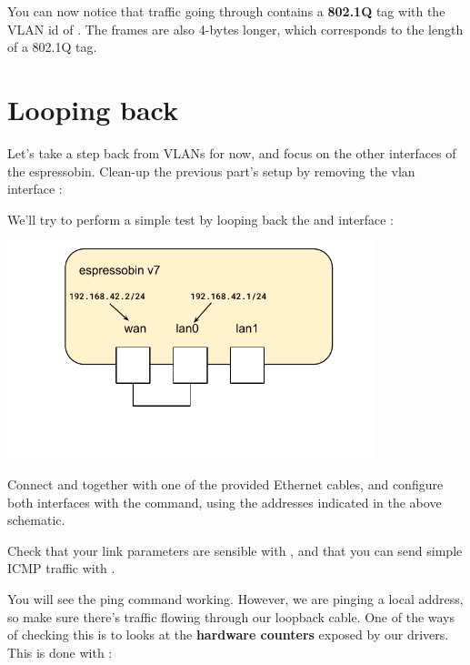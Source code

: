You can now notice that traffic going through  contains a \textbf{802.1Q} tag with the VLAN id of . The frames are also 4-bytes longer, which corresponds to the length of a 802.1Q tag.

\section{Looping back}

Let's take a step back from VLANs for now, and focus on the other interfaces of the espressobin.
Clean-up the previous part's setup by removing the vlan interface :


We'll try to perform a simple test by looping back the  and  interface :

\begin{center}
\includegraphics[width=0.8\textwidth]{labs/networking-stack/04_LAB1_espressobin_loopback.pdf}
\end{center}

Connect  and  together with one of the provided Ethernet cables, and configure both
interfaces with the  command, using the addresses indicated in the above schematic.

Check that your link parameters are sensible with , and that you can send simple ICMP traffic with .

You will see the ping command working. However, we are pinging a local address, so make sure there's traffic flowing through our loopback cable. One of the ways
of checking this is to looks at the \textbf{hardware counters} exposed by our drivers. This is done with  :

